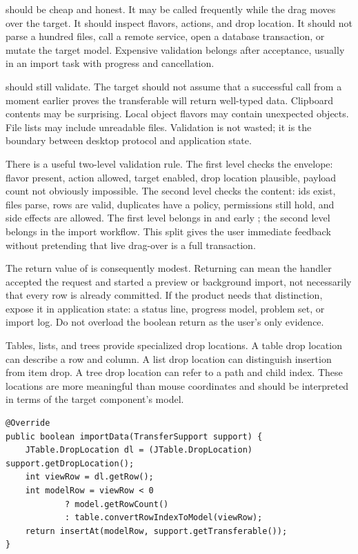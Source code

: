  should be cheap and honest. It may be called frequently while the drag moves over the target. It should inspect flavors, actions, and drop location. It should not parse a hundred files, call a remote service, open a database transaction, or mutate the target model. Expensive validation belongs after acceptance, usually in an import task with progress and cancellation.

 should still validate. The target should not assume that a successful  call from a moment earlier proves the transferable will return well-typed data. Clipboard contents may be surprising. Local object flavors may contain unexpected objects. File lists may include unreadable files. Validation is not wasted; it is the boundary between desktop protocol and application state.

There is a useful two-level validation rule. The first level checks the envelope: flavor present, action allowed, target enabled, drop location plausible, payload count not obviously impossible. The second level checks the content: ids exist, files parse, rows are valid, duplicates have a policy, permissions still hold, and side effects are allowed. The first level belongs in  and early ; the second level belongs in the import workflow. This split gives the user immediate feedback without pretending that live drag-over is a full transaction.

The return value of  is consequently modest. Returning  can mean the handler accepted the request and started a preview or background import, not necessarily that every row is already committed. If the product needs that distinction, expose it in application state: a status line, progress model, problem set, or import log. Do not overload the boolean return as the user's only evidence.

Tables, lists, and trees provide specialized drop locations. A table drop location can describe a row and column. A list drop location can distinguish insertion from item drop. A tree drop location can refer to a path and child index. These locations are more meaningful than mouse coordinates and should be interpreted in terms of the target component's model.

\begin{lstlisting}[caption={Using JTable.DropLocation for row insertion.}]
@Override
public boolean importData(TransferSupport support) {
    JTable.DropLocation dl = (JTable.DropLocation) support.getDropLocation();
    int viewRow = dl.getRow();
    int modelRow = viewRow < 0
            ? model.getRowCount()
            : table.convertRowIndexToModel(viewRow);
    return insertAt(modelRow, support.getTransferable());
}
\end{lstlisting}

